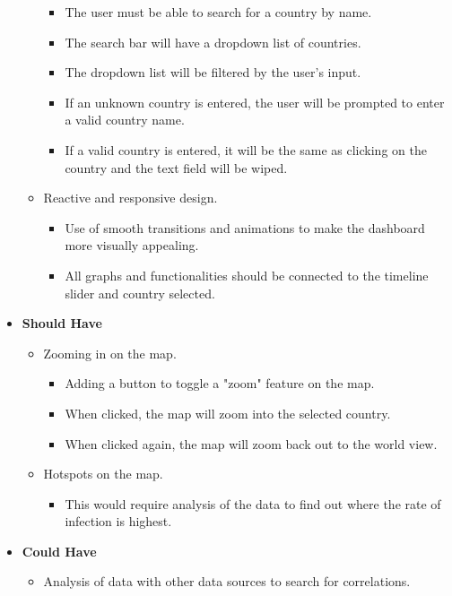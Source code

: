 \documentclass{report}
\begin{document}
\begin{itemize}
\begin{itemize}
\begin{itemize}
            \item The user must be able to search for a country by name.
            \item The search bar will have a dropdown list of countries.
            \item The dropdown list will be filtered by the user's input.
            \item If an unknown country is entered, the user will be prompted to enter a valid country name.
            \item If a valid country is entered, it will be the same as clicking on the country and the text field will be wiped.
        \end{itemize}
        \item Reactive and responsive design.
        \begin{itemize}
            \item Use of smooth transitions and animations to make the dashboard more visually appealing.
            \item All graphs and functionalities should be connected to the timeline slider and country selected.
        \end{itemize}
    \end{itemize}
    \item \textbf{\Large{Should Have}}
    \begin{itemize}
        \item Zooming in on the map.
        \begin{itemize}
            \item Adding a button to toggle a "zoom" feature on the map.
            \item When clicked, the map will zoom into the selected country.
            \item When clicked again, the map will zoom back out to the world view.
        \end{itemize}
        \item Hotspots on the map.
        \begin{itemize}
            \item This would require analysis of the data to find out where the rate of infection is highest.
        \end{itemize}
    \end{itemize}
    \item \textbf{\Large{Could Have}}
    \begin{itemize}
        \item Analysis of data with other data sources to search for correlations.

\end{itemize}
\end{itemize}
\end{document}
